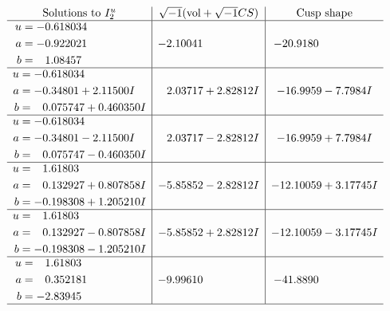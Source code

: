 \documentclass[1p]{elsarticle_modified}
\theoremstyle{definition}
\newcommand{\I}{\sqrt{-1}}
\begin{document}
$$\begin{array}{c|c|c}  
\text{Solutions to }I^u_{2}& \I (\text{vol} + \sqrt{-1}CS) & \text{Cusp shape}\\
 \hline 
\begin{aligned}
u &= -0.618034\phantom{ +0.000000I} \\
a &= -0.922021\phantom{ +0.000000I} \\
b &= \phantom{-}1.08457\phantom{ +0.000000I}\end{aligned}
 & -2.10041\phantom{ +0.000000I} & -20.9180\phantom{ +0.000000I} \\ \hline\begin{aligned}
u &= -0.618034\phantom{ +0.000000I} \\
a &= -0.34801 + 2.11500 I \\
b &= \phantom{-}0.075747 + 0.460350 I\end{aligned}
 & \phantom{-}2.03717 + 2.82812 I & -16.9959 - 7.7984 I \\ \hline\begin{aligned}
u &= -0.618034\phantom{ +0.000000I} \\
a &= -0.34801 - 2.11500 I \\
b &= \phantom{-}0.075747 - 0.460350 I\end{aligned}
 & \phantom{-}2.03717 - 2.82812 I & -16.9959 + 7.7984 I \\ \hline\begin{aligned}
u &= \phantom{-}1.61803\phantom{ +0.000000I} \\
a &= \phantom{-}0.132927 + 0.807858 I \\
b &= -0.198308 + 1.205210 I\end{aligned}
 & -5.85852 - 2.82812 I & -12.10059 + 3.17745 I \\ \hline\begin{aligned}
u &= \phantom{-}1.61803\phantom{ +0.000000I} \\
a &= \phantom{-}0.132927 - 0.807858 I \\
b &= -0.198308 - 1.205210 I\end{aligned}
 & -5.85852 + 2.82812 I & -12.10059 - 3.17745 I \\ \hline\begin{aligned}
u &= \phantom{-}1.61803\phantom{ +0.000000I} \\
a &= \phantom{-}0.352181\phantom{ +0.000000I} \\
b &= -2.83945\phantom{ +0.000000I}\end{aligned}
 & -9.99610\phantom{ +0.000000I} & -41.8890\phantom{ +0.000000I}\\
 \hline 
 \end{array}$$\newpage\newpage\renewcommand{\arraystretch}{1}
\end{document}
